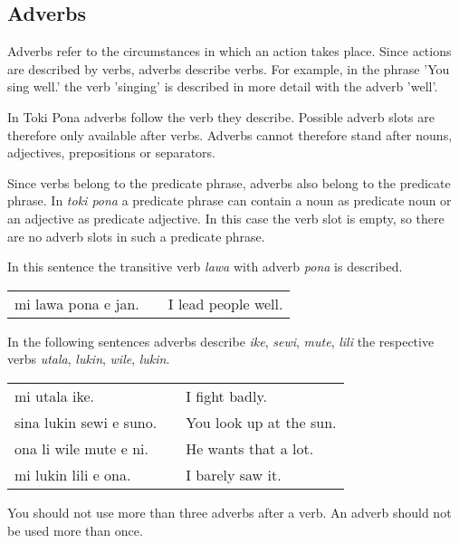 \newpage{}
%
\subsection*{Adverbs}
%

Adverbs refer to the circumstances in which an action takes place.
Since actions are described by verbs, adverbs describe verbs.
For example, in the phrase 'You sing well.' the verb 'singing' is described in more detail with the adverb 'well'.

In Toki Pona adverbs follow the verb they describe.
Possible adverb slots are therefore only available after verbs.
Adverbs cannot therefore stand after nouns, adjectives, prepositions or separators.

Since verbs belong to the predicate phrase, adverbs also belong to the predicate phrase.
In \textit{toki pona} a predicate phrase can contain a noun as predicate noun or an adjective as predicate adjective.
In this case the verb slot is empty, so there are no adverb slots in such a predicate phrase.

In this sentence the transitive verb \textit{lawa} with adverb \textit{pona} is described.

\begin{supertabular}{p{5,5cm}|ll}
    mi lawa pona e jan. &  & I lead people well. \\
\end{supertabular}

In the following sentences adverbs describe \textit{ike}, \textit{sewi}, \textit{mute}, \textit{lili} the respective verbs \textit{utala}, \textit{lukin}, \textit{wile}, \textit{lukin}.

\begin{supertabular}{p{5,5cm}|ll}
    mi utala ike.           &  & I fight badly.          \\
    sina lukin sewi e suno. &  & You look up at the sun. \\
    ona li wile mute e ni.  &  & He wants that a lot.    \\
    mi lukin lili e ona.    &  & I barely saw it.        \\
\end{supertabular}

You should not use more than three adverbs after a verb.
An adverb should not be used more than once.

